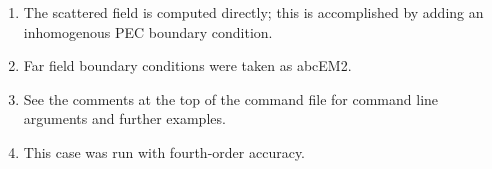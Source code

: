 \begin{enumerate}
  \item The scattered field is computed directly; this is accomplished by adding an inhomogenous PEC boundary condition.
  \item Far field boundary conditions were taken as abcEM2.
  \item See the comments at the top of the command file for command line arguments and further examples.
  \item This case was run with fourth-order accuracy.
\end{enumerate}
